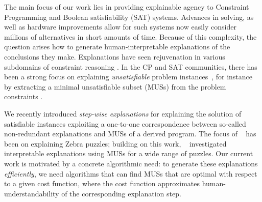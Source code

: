 \documentclass[twoside,11pt]{article}
\newcommand\citet[1]{\citeauthor{#1}~\citeyear{#1}}
\newcommand\comment[1]{\marginpar{\tiny #1}}
\renewcommand\comment[1]{#1}
\newcommand{\bart}[1]{{\comment{\color{OliveGreen}Bart: #1}}}
\begin{document}
The main focus of our work lies in providing explainable agency \cite{langley2017explainable} to Constraint Programming \cite{fai/Rossi06} and Boolean satisfiability (SAT) \cite{faia/2009-185}  systems.
Advances in solving, as well as hardware improvements allow for such systems now easily consider millions of alternatives in short amounts of time.
Because of this complexity, the question arises how to generate human-interpretable explanations of the conclusions they make. 
Explanations have seen rejuvenation in various subdomains of constraint reasoning \cite{fox2017explainable,vcyras2019argumentation,chakraborti2017plan,ecai/BogaertsGCG20}.
In the CP and SAT communities, there has been a strong focus on explaining \textit{unsatisfiable} problem instances~\cite{junker2001quickxplain}, for instance by extracting a minimal unsatisfiable subset (MUSs) from the problem constraints \cite{DBLP:journals/jar/LiffitonS08}. %

We recently introduced \emph{step-wise explanations} \cite{ecai/BogaertsGCG20} for explaining the solution of satisfiable instances exploiting a one-to-one correspondence between so-called non-redundant explanations and MUSs of a derived program. The focus of \citet{ecai/BogaertsGCG20} has been on explaining Zebra puzzles; building on this work, \citet{schotten} investigated interpretable explanations using MUSs for a wide range of puzzles.  
Our current work is motivated by a concrete algorithmic need: to generate these explanations \emph{efficiently}, we need algorithms that can find MUSs that are optimal with respect to a given cost function, where the cost function approximates human-understandability of the corresponding explanation step. 
\end{document}
